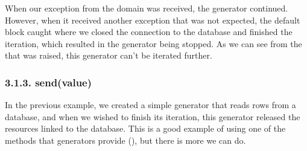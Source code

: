 \documentclass[a4paper,10pt,english]{sphinxmanual}
\begin{document}
\begin{sphinxVerbatim}[commandchars=\\\{\}]
  
\end{sphinxVerbatim}

When our exception from the domain was received, the generator continued. However,
when it received another exception that was not expected, the default block caught where
we closed the connection to the database and finished the iteration, which resulted in the
generator being stopped. As we can see from the  that was raised, this
generator can’t be iterated further.


\subsubsection{3.1.3. send(value)}
\label{\detokenize{chapters/7_generators/index:send-value}}
In the previous example, we created a simple generator that reads rows from a database,
and when we wished to finish its iteration, this generator released the resources linked to
the database. This is a good example of using one of the methods that generators provide
(), but there is more we can do.
\end{document}
